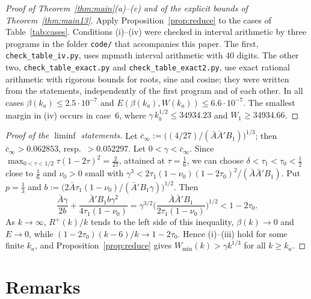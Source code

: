 \documentclass[11pt]{amsart}
\newcommand{\Abar}{\bar A}
\newcommand{\Wmin}{W_{\min}}
\theoremstyle{definition}
\theoremstyle{remark}
\numberwithin{equation}{section}
\begin{document}
\begin{proof}[Proof of Theorem~\ref{thm:main}\textup{(a)--(c)} and of the explicit bounds of Theorem~\ref{thm:main13}]
Apply Proposition~\ref{prop:reduce} to the cases of Table~\ref{tab:cases}. Conditions (i)--(iv) were checked in
interval arithmetic by three programs in the folder \texttt{code/} that accompanies this paper. The first,
\texttt{check\_table\_iv.py}, uses mpmath interval arithmetic with 40 digits. The other two,
\texttt{check\_table\_exact.py} and \texttt{check\_table\_exact2.py}, use exact rational arithmetic with rigorous bounds
for roots, sine and cosine; they were written from the statements, independently of the first program and of each
other. In all cases $\beta(k_a)\le2.5\cdot10^{-7}$ and $E(\beta(k_a),W(k_a))\le6.6\cdot10^{-7}$. The smallest margin in
(iv) occurs in case~6, where $\gamma\,k_b^{1/2}\le34934.23$ and $W_1\ge34934.66$.
\end{proof}

\begin{proof}[Proof of the $\liminf$ statements]
Let $\bar c_\infty:=\big((4/27)/(\Abar\bar A'B_1)\big)^{1/3}$; then $\bar c_\infty>0.062853$, resp.\ $>0.052297$. Let
$0<\gamma<\bar c_\infty$. Since $\max_{0<\tau<1/2}\tau(1-2\tau)^2=\frac2{27}$, attained at $\tau=\frac16$, we can choose
$\delta<\tau_1<\tau_0<\frac12$ close to $\frac16$ and $\nu_0>0$ small with
$\gamma^3<2\tau_1(1-\nu_0)(1-2\tau_0)^2/(\Abar\bar A'B_1)$. Put $p=\frac13$ and
$b:=\big(2\Abar\tau_1(1-\nu_0)/(\bar A'B_1\gamma)\big)^{1/2}$. Then
\[
\frac{\Abar\gamma}{2b}+\frac{\bar A'B_1b\gamma^2}{4\tau_1(1-\nu_0)}
=\gamma^{3/2}\Big(\frac{\Abar\bar A'B_1}{2\tau_1(1-\nu_0)}\Big)^{1/2}<1-2\tau_0 .
\]
As $k\to\infty$, $R^+(k)/k$ tends to the left side of this inequality, $\beta(k)\to0$ and $E\to0$, while
$(1-2\tau_0)(k-6)/k\to1-2\tau_0$. Hence (i)--(iii) hold for some finite $k_a$, and Proposition~\ref{prop:reduce} gives
$\Wmin(k)>\gamma k^{1/3}$ for all $k\ge k_a$.
\end{proof}

\section{Remarks}\label{sec:remarks}
\end{document}
